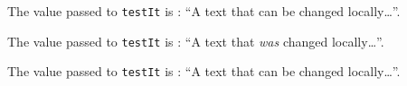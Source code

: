 \documentclass{article}
\newcommand{\testIt}[1][A text that can be changed locally\ldots]{The value passed to \texttt{testIt} is : ``#1''.}
\begin{document}
\testIt

\testIt[A text that \textit{was} changed locally\ldots]

\testIt
\end{document}
